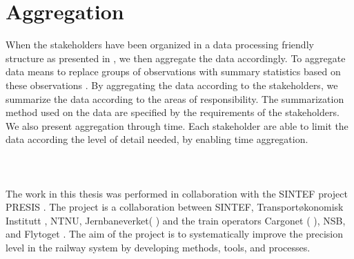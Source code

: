 \section{Aggregation} %
\label{sec:intro_aggregation}
When the stakeholders have been organized in a data processing friendly
structure as presented in , we then aggregate the 
data accordingly. To aggregate data means to replace groups of observations
with summary statistics based on these observations \cite{ wiki:Aggregation}.
By aggregating the data according to the stakeholders, we summarize the data
according to the areas of responsibility. The summarization method used on the 
data are specified by the requirements of the stakeholders. We also present
aggregation through time. Each stakeholder are able to limit the data 
according the level of detail needed, by enabling time aggregation.
\\ 
\\ 
\\ 
\\



The work in this thesis was performed in collaboration with the SINTEF
project PRESIS \cite{sintefPresis}. The project is 
a collaboration between SINTEF\cite{sintef}, Transportøkonomisk Institutt
\cite{transportOkonomiskInstitutt}, NTNU\cite{ntnu}, Jernbaneverket(
) and the train operators Cargonet (
), NSB\cite{nsbForside}, and Flytoget
\cite{flytoget}. The aim of the project is to systematically improve the 
precision level in the railway system by developing methods, tools, and 
processes.


